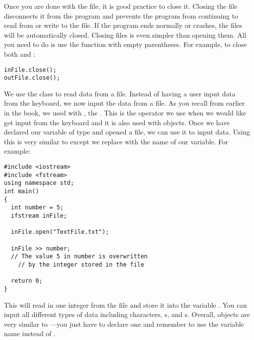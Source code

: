 
Once you are done with the file, it is good practice to close it. 
Closing the file disconnects it from the program and prevents the program from continuing to read from or write to the file. 
If the program ends normally or crashes, the files will be automatically closed. 
Closing files is even simpler than opening them. 
All you need to do is use the  function with empty parentheses. 
For example, to close both  and :

\noindent\begin{minipage}{\linewidth}\begin{lstlisting}		
inFile.close();
outFile.close();
\end{lstlisting}\end{minipage}
	

We use the  class to read data from a file. 
Instead of having a user input data from the keyboard, we now input the data from a file. 
As you recall from earlier in the book, we used  with \Code{>>}, the . 
This is the operator we use when we would like get input from the keyboard and it is also used with  objects. 
Once we have declared our variable of type  and opened a file, we can use it to input data. 
Using this is very similar to  except we replace  with the name of our variable.
For example: \nopagebreak[4]

\noindent\begin{minipage}{\linewidth}\begin{lstlisting}		
#include <iostream> 
#include <fstream>
using namespace std;
int main()
{
  int number = 5;
  ifstream inFile;

  inFile.open("TextFile.txt");

  inFile >> number; 
  // The value 5 in number is overwritten
	// by the integer stored in the file

  return 0;
}
\end{lstlisting}\end{minipage}		

This will read in one integer from the file and store it into the variable . 
You can input all different types of data including characters, s, and s. 
Overall,  objects are very similar to ---you just have to declare one and remember to use the variable name instead of .

